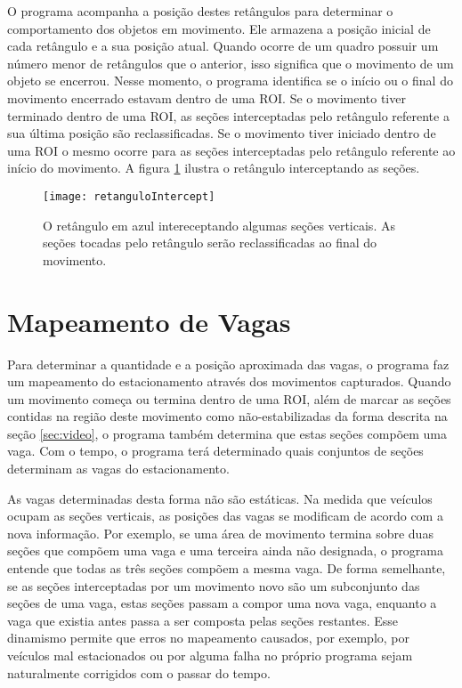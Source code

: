 O programa acompanha a posição destes retângulos para determinar o comportamento dos objetos em movimento. Ele armazena a posição inicial de cada retângulo e a sua posição atual. Quando ocorre de um quadro possuir um número menor de retângulos que o anterior, isso significa que o movimento de um objeto se encerrou. Nesse momento, o programa identifica se o início ou o final do movimento encerrado estavam dentro de uma ROI. Se o movimento tiver terminado dentro de uma ROI, as seções interceptadas pelo retângulo referente a sua última posição são reclassificadas. Se o movimento tiver iniciado dentro de uma ROI o mesmo ocorre para as seções interceptadas pelo retângulo referente ao início do movimento. A figura \ref{fig:movimentoIntercept} ilustra o retângulo interceptando as seções.

\begin{figure}
\centering
\texttt{[image: retanguloIntercept]}
\centering
\caption{O retângulo em azul intereceptando algumas seções verticais. As seções tocadas pelo retângulo serão reclassificadas ao final do movimento.}
\label{fig:movimentoIntercept}
\end{figure}


\section{Mapeamento de Vagas}

Para determinar a quantidade e a posição aproximada das vagas, o programa faz um mapeamento do estacionamento através dos movimentos capturados. Quando um movimento começa ou termina dentro de uma ROI, além de marcar as seções contidas na região deste movimento como não-estabilizadas da forma descrita na seção \ref{sec:video}, o programa também determina que estas seções compõem uma vaga. Com o tempo, o programa terá determinado quais conjuntos de seções determinam as vagas do estacionamento.

As vagas determinadas desta forma não são estáticas. Na medida que veículos ocupam as seções verticais, as posições das vagas se modificam de acordo com a nova informação. Por exemplo, se uma área de movimento termina sobre duas seções que compõem uma vaga e uma terceira ainda não designada, o programa entende que todas as três seções compõem a mesma vaga. De forma semelhante, se as seções interceptadas por um movimento novo são um subconjunto das seções de uma vaga, estas seções passam a compor uma nova vaga, enquanto a vaga que existia antes passa a ser composta pelas seções restantes. Esse dinamismo permite que erros no mapeamento causados, por exemplo, por veículos mal estacionados ou por alguma falha no próprio programa sejam naturalmente corrigidos com o passar do tempo.

